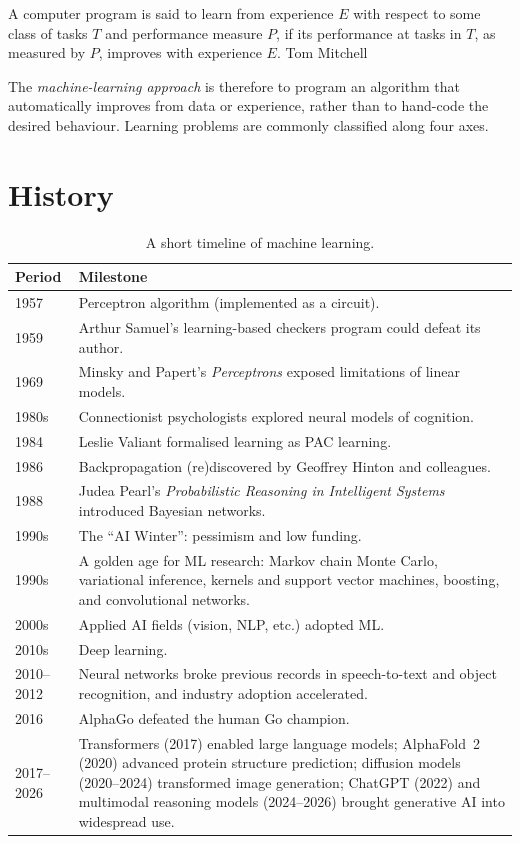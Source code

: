\documentclass[a4paper, 12pt]{book}
\begin{document}
\begin{epigraph}
{
A computer program is said to learn from experience $E$ with respect to some class of
tasks $T$ and performance measure $P$, if its performance at tasks in $T$, as
measured by $P$, improves with experience $E$.
}{Tom Mitchell}
\end{epigraph}

The \emph{machine-learning approach} is therefore to program an algorithm that automatically improves from data or experience, rather than to hand-code the desired behaviour. Learning problems are commonly classified along four axes.

\section{History}

\begin{table}[H]
    \centering
    \caption{A short timeline of machine learning.}
    \label{tab:ml-history}
    \begin{tabularx}{\textwidth}{@{}p{1.8cm}X@{}}
        \toprule
        Period & Milestone \\
        \midrule
        1957 & Perceptron algorithm (implemented as a circuit). \\
        1959 & Arthur Samuel's learning-based checkers program could defeat its author. \\
        1969 & Minsky and Papert's \emph{Perceptrons} exposed limitations of linear models. \\
        1980s & Connectionist psychologists explored neural models of cognition. \\
        1984 & Leslie Valiant formalised learning as PAC learning. \\
        1986 & Backpropagation (re)discovered by Geoffrey Hinton and colleagues. \\
        1988 & Judea Pearl's \emph{Probabilistic Reasoning in Intelligent Systems} introduced Bayesian networks. \\
        1990s & The ``AI Winter'': pessimism and low funding. \\
        1990s & A golden age for ML research: Markov chain Monte Carlo, variational inference, kernels and support vector machines, boosting, and convolutional networks. \\
        2000s & Applied AI fields (vision, NLP, etc.) adopted ML. \\
        2010s & Deep learning. \\
        2010--2012 & Neural networks broke previous records in speech-to-text and object recognition, and industry adoption accelerated. \\
        2016 & AlphaGo defeated the human Go champion. \\
        2017--2026 & Transformers (2017) enabled large language models; AlphaFold~2 (2020) advanced protein structure prediction; diffusion models (2020--2024) transformed image generation; ChatGPT (2022) and multimodal reasoning models (2024--2026) brought generative AI into widespread use. \\
        \bottomrule
    \end{tabularx}
\end{table}
\end{document}
